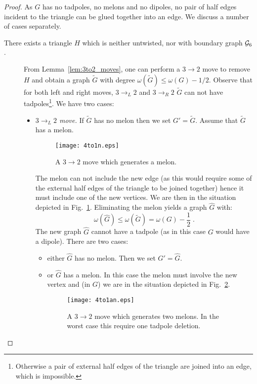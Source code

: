 \documentclass[10pt]{article}
\theoremstyle{plain}
\theoremstyle{definition}
\newcommand{\cG}{{\cal G}}
\begin{document}
\begin{proof}
As $G$ has no tadpoles, no melons and no dipoles, no pair of half edges incident to the triangle can be glued together into an edge. We discuss a number of cases separately.

\begin{description}
\item[There exists a triangle $H$ which is neither untwisted, nor with boundary graph $\cG_6$.] From Lemma~\ref{lem:3to2_moves}, one can perform a $3\to 2$ move to remove $H$ 
and obtain a graph $\tilde G$ with degree $\omega(\tilde G) \leq \omega(G) - 1/2$. Observe that for both left and  right moves, $3\to_L 2$ and $3\to_R 2$ 
$\tilde G$ can not have tadpoles\footnote{Otherwise a pair of external half edges of the triangle are joined into an edge, which is impossible.}.
We have two cases:
\begin{itemize}  
\item{\it $3\to_L 2$ move.} If $\tilde G$ has no melon then we set $G' = \tilde G$. Assume that $ \tilde G$ has a melon. 
 \begin{figure}[htb]
 \begin{center}
 \texttt{[image: 4to1n.eps]}  
 \caption{A $3\to2$ move which generates a melon.} \label{fig:4to1}
 \end{center}
 \end{figure}
The melon can not include the new edge (as this would require some of the 
external half edges of the triangle to be joined together) hence it must include one of the new vertices. We are then 
in the situation depicted in Fig.~\ref{fig:4to1}.
  Eliminating the melon yields a graph $\hat G$ with:
    \[ \omega( \hat G) \le \omega(\tilde G) = \omega(G) -\frac{1}{2} \; .\]
   The new graph $\hat G$ cannot have a tadpole (as in this case $G$ would have a dipole). There are two cases:
    \begin{itemize}
     \item either $\hat G$ has no melon. Then we set $G' = \hat G$. 
     \item or $\hat G$ has a melon. In this case the melon must involve the new vertex and (in $G$) we are in the situation depicted in Fig.~\ref{fig:4to1a}.
 \begin{figure}[htb]
 \begin{center}
 \texttt{[image: 4to1an.eps]}  
 \caption{A $3\to2$ move which generates two melons. In the worst case this require one tadpole deletion.} \label{fig:4to1a}
 \end{center}
 \end{figure}  
 

\end{itemize}
\end{itemize}
\end{description}
\end{proof}
\end{document}
